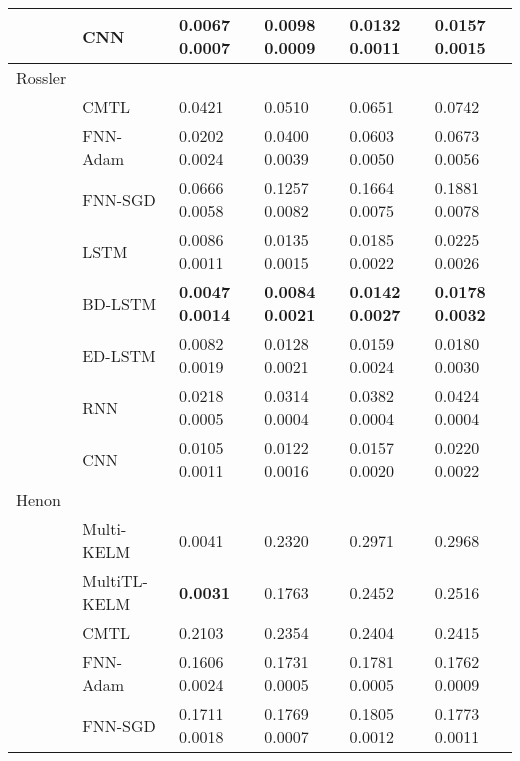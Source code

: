 \documentclass[final,5p,times,twocolumn]{elsarticle}
\begin{document}
\begin{table*}[htbp!]
\begin{tabular}{llllll}
&CNN &  	0.0067	0.0007    	&  0.0098	0.0009      &0.0132	0.0011	       &0.0157	0.0015\\
\hline



 
Rossler &    	  &	& \\

&CMTL \cite{chandra2017CMTLMulti} & 0.0421   & 0.0510  &0.0651	& 0.0742 	   \\


&FNN-Adam & 0.0202	0.0024     	&  0.0400	0.0039      &0.0603	0.0050	       &0.0673	0.0056\\

&FNN-SGD  &  0.0666	0.0058    	& 0.1257	0.0082       &0.1664	0.0075	       &0.1881	0.0078\\

&LSTM   &  0.0086	0.0011    	&  0.0135	0.0015      &0.0185	0.0022	       &0.0225	0.0026\\

&BD-LSTM   &  \textbf{0.0047	0.0014}    	& \textbf{ 0.0084	0.0021 }     &	\textbf{0.0142	0.0027 }      &\textbf{0.0178	0.0032}\\

&ED-LSTM   &  0.0082	0.0019    	&   0.0128	0.0021     &0.0159	0.0024	       &0.0180	0.0030\\

&RNN  &    0.0218	0.0005  	&   0.0314	0.0004     &0.0382	0.0004	       &0.0424	0.0004\\

&CNN & 0.0105		0.0011     	&  0.0122		0.0016      &	0.0157		0.0020	       &	0.0220		0.0022\\
\hline


 
 
 
 

 
 
Henon &    	  & 	& \\
&Multi-KELM\cite{YE2019227}&0.0041&	0.2320&	0.2971&	0.2968\\
&MultiTL-KELM\cite{YE2019227}&	 \textbf{0.0031}&	0.1763&0.2452&	0.2516\\
&CMTL \cite{chandra2017CMTLMulti} & 0.2103   & 0.2354  &0.2404	   & 0.2415 \\


&FNN-Adam &  0.1606   0.0024     	&0.1731   0.0005         &	0.1781   0.0005        & 0.1762   0.0009\\

&FNN-SGD  & 0.1711    0.0018     	&  0.1769    0.0007      &0.1805    0.0012	       &0.1773    0.0011\\


\end{tabular}
\end{table*}
\end{document}
